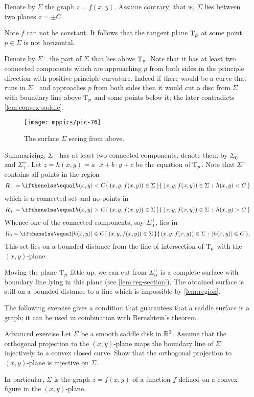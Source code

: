 Denote by $\Sigma$ the graph $z=f(x,y)$.
Assume contrary; that is, $\Sigma$ lies between two planes $z=\pm C$.

Note $f$ can not be constant.
It follows that the tangent plane $\mathrm{T}_p$ at some point $p\in\Sigma$ is not horizontal.

Denote by $\Sigma^+$ the part of $\Sigma$ that lies above $\mathrm{T}_p$.
Note that it has at least two connected components which are approaching $p$ from both sides 
in the principle direction with positive principle curvature.
Indeed if there would be a curve that runs in $\Sigma^+$ and approaches $p$ from both sides then it would cut a disc from $\Sigma$ with boundary line above $\mathrm{T}_p$ and some points below it;
the later contradicts \ref{lem:convex-saddle}.

\begin{figure}[h!]
\vskip-0mm
\centering
\texttt{[image: mppics/pic-76]}
\caption*{The surface $\Sigma$ seeing from above.}
\vskip0mm
\end{figure}

Summarizing, $\Sigma^+$ has at least two connected components, denote them by $\Sigma^+_0$ and $\Sigma^+_1$.
Let $z=h(x,y)=a\cdot x+b\cdot y+c$ be the equation of $\mathrm{T}_p$.
Note that $\Sigma^+$ contains all points in the region
\[R_-=\set{(x,y,f(x,y))\in\Sigma}{h(x,y)< C}\] 
which is a connected set and no points in 
\[R_+=\set{(x,y,f(x,y))\in\Sigma}{h(x,y)> C}\]
Whence one of the connected components, say $\Sigma^+_0$, lies in 
\[R_0=\set{(x,y,f(x,y))\in\Sigma}{|h(x,y)|\le  C}.\]
This set lies on a bounded distance from the line of intersection of $\mathrm{T}_p$ with the $(x,y)$-plane.

Moving the plane $\mathrm{T}_p$ little up, we can cut from $\Sigma^+_0$ is a complete surface with boundary line lying in this plane (see \ref{lem:reg-section}).
The obtained surface is still on a bounded distance to a line
which is impossible by \ref{lem:region}.
\qeds

The following exercise gives a condition that guarantees that a saddle surface is a graph;
it can be used in combination with Bernshtein's theorem.

\begin{thm}{Advanced exercise}
Let $\Sigma$ be a smooth saddle disk in $\mathbb{R}^3$.
Assume that the orthogonal projection to the $(x,y)$-plane
maps the boundary line of $\Sigma$
injectively to a convex closed curve.
Show that the orthogonal projection to $(x,y)$-plane is injective on $\Sigma$.

In particular, $\Sigma$ is the graph $z=f(x,y)$ of a function $f$ defined on a convex figure in the $(x,y)$-plane.
\end{thm}

